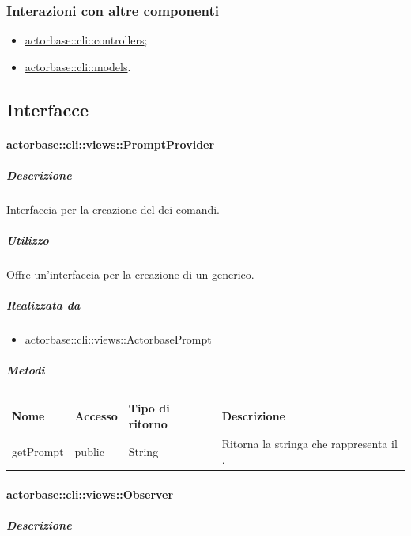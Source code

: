 \documentclass{scalatekids-article}
\begin{document}
\subsubsection{Interazioni con altre componenti}

\begin{itemize}
	\item \hyperref[sec:actorbase::cli::controllers]{actorbase::cli::controllers};
	\item \hyperref[sec:actorbase::cli::models]{actorbase::cli::models}.
\end{itemize}

\subsection{Interfacce}

\paragraph{actorbase::cli::views::PromptProvider}
\label{sec:actorbase::cli::views::PromptProvider}

\subparagraph{Descrizione}

Interfaccia per la creazione del  dei comandi.

\subparagraph{Utilizzo}

Offre un'interfaccia per la creazione di un  generico.

\subparagraph{Realizzata da}

\begin{itemize}
	\item actorbase::cli::views::ActorbasePrompt
\end{itemize}

\subparagraph{Metodi}

\begin{tabular}{| l | l | l | l |}
	\hline
	Nome & Accesso & Tipo di ritorno & Descrizione\\
	\hline
	getPrompt & public & String & Ritorna la stringa che rappresenta il \gloss{prompt}.\\
	\hline
\end{tabular}

\paragraph{actorbase::cli::views::Observer}
\label{sec:actorbase::cli::views::Observer}

\subparagraph{Descrizione}
\end{document}
